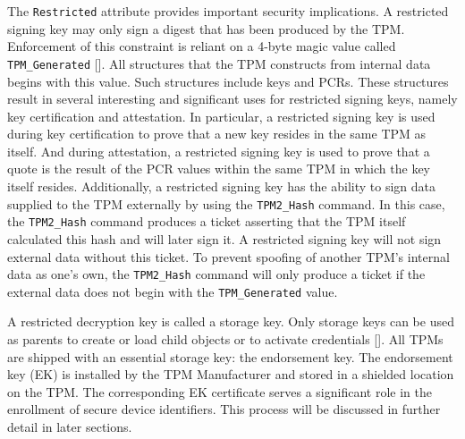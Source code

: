 The \verb|Restricted| attribute provides important security implications. A restricted signing key may only sign a digest that has been produced by the TPM. Enforcement of this constraint is reliant on a 4-byte magic value called \verb|TPM_Generated| [\cite{TPMSpec}]. All structures that the TPM constructs from internal data begins with this value. Such structures include keys and PCRs. These structures result in several interesting and significant uses for restricted signing keys, namely key certification and attestation. In particular, a restricted signing key is used during key certification to prove that a new key resides in the same TPM as itself. And during attestation, a restricted signing key is used to prove that a quote is the result of the PCR values within the same TPM in which the key itself resides. Additionally, a restricted signing key has the ability to sign data supplied to the TPM externally by using the \verb|TPM2_Hash| command. In this case, the \verb|TPM2_Hash| command produces a ticket asserting that the TPM itself calculated this hash and will later sign it. A restricted signing key will not sign external data without this ticket. To prevent spoofing of another TPM's internal data as one's own, the \verb|TPM2_Hash| command will only produce a ticket if the external data does not begin with the \verb|TPM_Generated| value.


A restricted decryption key is called a storage key. Only storage keys can be used as parents to create or load child objects or to activate credentials [\cite{PracticalGuide}]. All TPMs are shipped with an essential storage key: the endorsement key. The endorsement key (EK) is installed by the TPM Manufacturer and stored in a shielded location on the TPM. The corresponding EK certificate serves a significant role in the enrollment of secure device identifiers. This process will be discussed in further detail in later sections.

